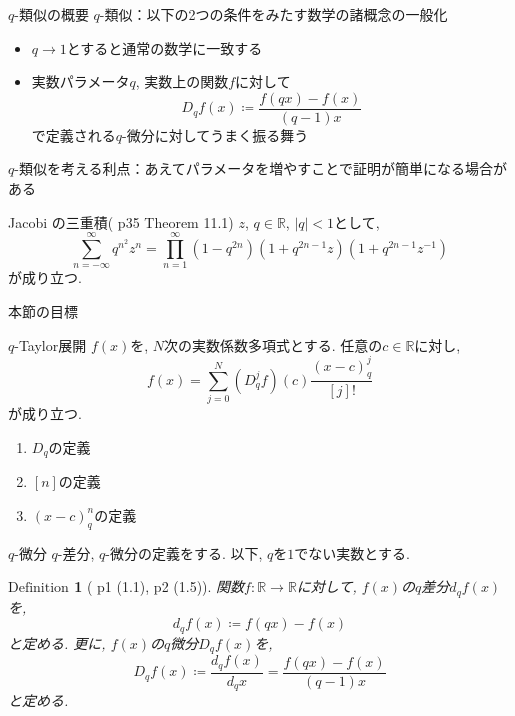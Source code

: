 \documentclass[dvipdfmx,cjk]{beamer}
\theoremstyle{mystyle}
\newtheorem{df}{$\textrm{Definition}$}[section]
\newcommand{\R}{\mathbb{R}}
\newcommand{\0}{\textbf{0}}
\begin{document}
\begin{frame}
  \tableofcontents[currentsection] 
\end{frame}

\begin{frame}{$q$-類似の概要}
  $q$-類似：以下の2つの条件をみたす数学の諸概念の一般化 \pause
  \begin{itemize}
    \item $q \to 1$とすると通常の数学に一致する \pause
    \item 実数パラメータ$q$, 実数上の関数$f$に対して
      \[
        D_q f(x) \coloneqq \frac{f(qx) - f(x)}{(q - 1) x}
      \]
    で定義される$q$-微分に対してうまく振る舞う \pause
  \end{itemize}
  $q$-類似を考える利点：あえてパラメータを増やすことで証明が簡単になる場合がある \pause
  \begin{itembox}{Jacobi の三重積(\cite{Kac} p35 Theorem 11.1)}
    $z$, $q \in \R$, $|q| < 1$として, 
    \[
      \sum_{n = -\infty}^{\infty} q^{n^2} z^n =
      \prod_{n = 1}^{\infty} (1 - q^{2n})(1 + q^{2n - 1}z)(1 + q^{2n - 1}z^{-1})
    \]
    が成り立つ. 
  \end{itembox}
\end{frame}

\begin{frame}{本節の目標}
	\begin{itembox}{$q$-Taylor展開}
		$f(x)$を, $N$次の実数係数多項式とする. 任意の$c\in\R$に対し, 
		\[
			f(x) = \sum_{j=0}^N (D_q^jf)(c)\frac{(x-c)^j_q}{[j]!}
		\]
		が成り立つ. 
	\end{itembox}
	\begin{enumerate}
		\item $D_q$の定義
		\item $[n]$の定義
		\item $(x -c)^n_q$の定義
	\end{enumerate}
\end{frame}

\begin{frame}{$q$-微分}
  $q$-差分, $q$-微分の定義をする. 以下, $q$を$1$でない実数とする. \pause
  \begin{df}[\cite{Kac} p1 (1.1), p2 (1.5)]
    関数$f : \R \to \R$に対して, $f(x)$の$q$差分$d_q f(x)$を, 
    \[
      d_q f(x) \coloneqq f (qx) - f(x)
    \]
    と定める. 更に, $f(x)$の$q$微分$D_q f(x)$を, 
    \[
      D_q f(x) \coloneqq \frac{d_q f(x)}{d_q x} = \frac{f(qx) - f(x)}{(q - 1) x}
    \]
    と定める. 
  \end{df}
\end{frame}
\end{document}
